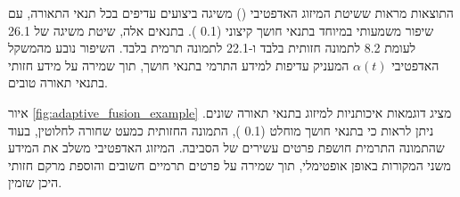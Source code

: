\begin{table}[htbp]
\centering
\caption{השוואת מדדי איכות מיזוג תמונות בשיטות שונות בתנאי תאורה משתנים.}
\label{tab:ch08_fusion_metrics}
\end{table}

התוצאות מראות ששיטת המיזוג האדפטיבי () משיגה ביצועים עדיפים בכל תנאי התאורה, עם שיפור משמעותי במיוחד בתנאי חושך קיצוני (0.1 ). בתנאים אלה, שיטת  משיגה  של 26.1  לעומת 8.2  לתמונה חזותית בלבד ו-22.1  לתמונה תרמית בלבד. השיפור נובע מהמשקל האדפטיבי $\alpha(t)$ המעניק עדיפות למידע התרמי בתנאי חושך, תוך שמירה על מידע חזותי בתנאי תאורה טובים.

איור \ref{fig:adaptive_fusion_example} מציג דוגמאות איכותניות למיזוג בתנאי תאורה שונים. ניתן לראות כי בתנאי חושך מוחלט (0.1 ), התמונה החזותית כמעט שחורה לחלוטין, בעוד שהתמונה התרמית חושפת פרטים עשירים של הסביבה. המיזוג האדפטיבי משלב את המידע משני המקורות באופן אופטימלי, תוך שמירה על פרטים תרמיים חשובים והוספת מרקם חזותי היכן שזמין.

